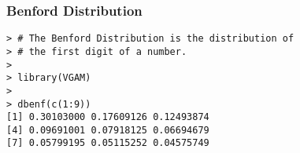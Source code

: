 \documentclass[MAIN.tex]{subfiles}
\begin{document}
%
\begin{frame}[fragile]
\frametitle{Benford Distribution}
\begin{framed}
\begin{verbatim}
> # The Benford Distribution is the distribution of 
> # the first digit of a number. 
>
> library(VGAM)
>
> dbenf(c(1:9))
[1] 0.30103000 0.17609126 0.12493874 
[4] 0.09691001 0.07918125 0.06694679
[7] 0.05799195 0.05115252 0.04575749
\end{verbatim}
\end{framed}
\end{frame}
\end{document}
